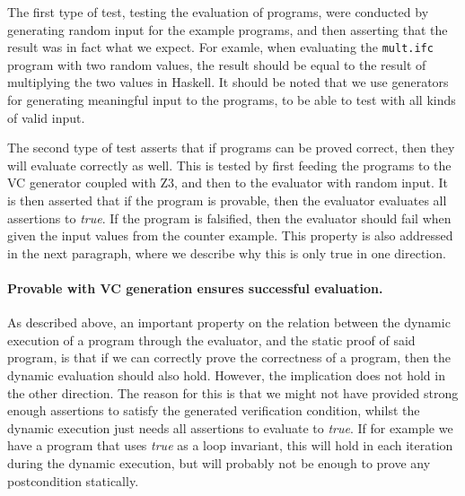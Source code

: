 The first type of test, testing the evaluation of programs, were conducted by generating random input for the example programs, and then asserting that the result was in fact what we expect. For examle, when evaluating the \texttt{mult.ifc} program with two random values, the result should be equal to the result of multiplying the two values in Haskell.
It should be noted that we use generators for generating meaningful input to the programs, to be able to test with all kinds of valid input.

The second type of test asserts that if programs can be proved correct, then they will evaluate correctly as well.
This is tested by first feeding the programs to the VC generator coupled with Z3, and then to the evaluator with random input.
It is then asserted that if the program is provable, then the evaluator evaluates all assertions to \textit{true}.
If the program is falsified, then the evaluator should fail when given the input values from the counter example.
This property is also addressed in the next paragraph, where we describe why this is only true in one direction.

\paragraph{Provable with VC generation ensures successful evaluation.}

As described above, an important property on the relation between the dynamic execution of a program through the evaluator, and the static proof of said program, is that if we can correctly prove the correctness of a program, then the dynamic evaluation should also hold. 
However, the implication does not hold in the other direction. The reason for this is that we might not have provided strong enough assertions to satisfy the generated verification condition, whilst the dynamic execution just needs all assertions to evaluate to \textit{true}.
If for example we have a program that uses \textit{true} as a loop invariant, this will hold in each iteration during the dynamic execution, but will probably not be enough to prove any postcondition statically.

